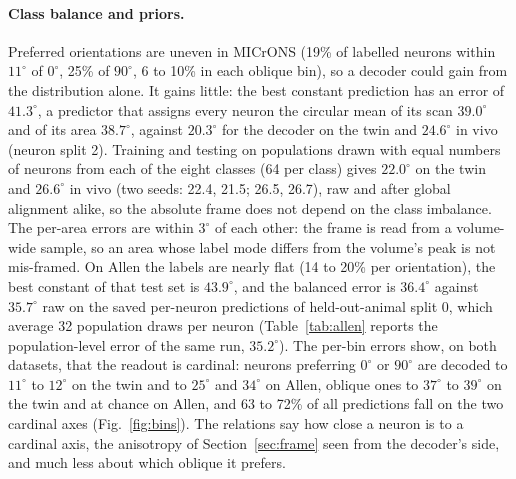 \documentclass[11pt]{article}
\begin{document}
\paragraph{Class balance and priors.} Preferred orientations are uneven in MICrONS (19\% of labelled neurons within $11^\circ$ of $0^\circ$, 25\% of $90^\circ$, 6 to 10\% in each oblique bin), so a decoder could gain from the distribution alone. It gains little: the best constant prediction has an error of $41.3^\circ$, a predictor that assigns every neuron the circular mean of its scan $39.0^\circ$ and of its area $38.7^\circ$, against $20.3^\circ$ for the decoder on the twin and $24.6^\circ$ in vivo (neuron split 2). Training and testing on populations drawn with equal numbers of neurons from each of the eight classes (64 per class) gives $22.0^\circ$ on the twin and $26.6^\circ$ in vivo (two seeds: 22.4, 21.5; 26.5, 26.7), raw and after global alignment alike, so the absolute frame does not depend on the class imbalance. The per-area errors are within $3^\circ$ of each other: the frame is read from a volume-wide sample, so an area whose label mode differs from the volume's peak is not mis-framed. On Allen the labels are nearly flat (14 to 20\% per orientation), the best constant of that test set is $43.9^\circ$, and the balanced error is $36.4^\circ$ against $35.7^\circ$ raw on the saved per-neuron predictions of held-out-animal split 0, which average 32 population draws per neuron (Table~\ref{tab:allen} reports the population-level error of the same run, $35.2^\circ$). The per-bin errors show, on both datasets, that the readout is cardinal: neurons preferring $0^\circ$ or $90^\circ$ are decoded to $11^\circ$ to $12^\circ$ on the twin and to $25^\circ$ and $34^\circ$ on Allen, oblique ones to $37^\circ$ to $39^\circ$ on the twin and at chance on Allen, and 63 to 72\% of all predictions fall on the two cardinal axes (Fig.~\ref{fig:bins}). The relations say how close a neuron is to a cardinal axis, the anisotropy of Section~\ref{sec:frame} seen from the decoder's side, and much less about which oblique it prefers.
\end{document}
